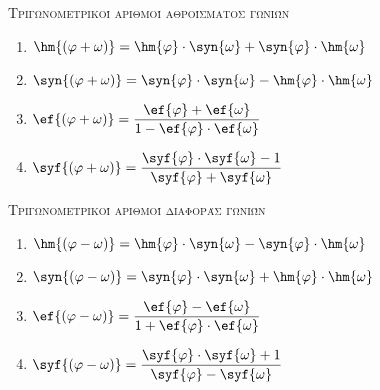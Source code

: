 \documentclass[twoside,10pt]{book}
\def\xrwma{cyan!70!black}
\begin{document}
\begin{center}
{\large \scfont\scshape{\textcolor{\xrwma}{Τριγωνομετρικοί αριθμοί αθροίσματος γωνιών}}}
\end{center}
\begin{multicols}{2}
\begin{enumerate}[itemsep=0mm]
\item $ \hm{\left( \varphi+\omega\right) }=\hm{\varphi}\cdot\syn{\omega}+\syn{\varphi}\cdot\hm{\omega} $
\item $ \syn {\left( \varphi+\omega\right) }=\syn{\varphi}\cdot\syn{\omega}-\hm{\varphi}\cdot\hm{\omega} $
\item $ \ef{\left( \varphi+\omega\right) }=\dfrac{\ef{\varphi}+\ef{\omega}}{1-\ef{\varphi}\cdot\ef{\omega}} $
\item $ \syf{\left( \varphi+\omega\right) }=\dfrac{\syf{\varphi}\cdot\syf{\omega}-1}{\syf{\varphi}+\syf{\omega}} $
\end{enumerate}
\end{multicols}
\begin{center}
{\large \scfont\scshape{\textcolor{\xrwma}{Τριγωνομετρικοί αριθμοί διαφοράς γωνιών}}}
\end{center}
\begin{multicols}{2}
\begin{enumerate}[itemsep=0mm]
\item $ \hm{\left( \varphi-\omega\right) }=\hm{\varphi}\cdot\syn{\omega}-\syn{\varphi}\cdot\hm{\omega} $
\item $ \syn{\left( \varphi-\omega\right) }=\syn{\varphi}\cdot\syn{\omega}+\hm{\varphi}\cdot\hm{\omega} $
\item $ \ef{\left( \varphi-\omega\right) }=\dfrac{\ef{\varphi}-\ef{\omega}}{1+\ef{\varphi}\cdot\ef{\omega}} $
\item $ \syf{\left( \varphi-\omega\right) }=\dfrac{\syf{\varphi}\cdot\syf{\omega}+1}{\syf{\varphi}-\syf{\omega}} $
\end{enumerate}
\end{multicols}
\end{document}
